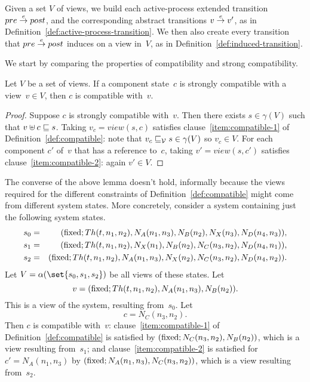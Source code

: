 \begin{definition}
\label{def:abstract-transition}
Given a set $V$ of views, we build each active-process extended transition
$pre \stackrel{e}\rightarrow post$, and the corresponding abstract transitions $v \stackrel{e}\rightarrow
v'$, as in Definition~\ref{def:active-process-transition}.
%
We then also create every transition that $pre \stackrel{e}\rightarrow post$ induces on a
view in~$V$, as in Definition~\ref{def:induced-transition}. 
\end{definition}

We start by comparing the properties of compatibility and strong compatibility.
%
\begin{lemma}
\label{lem:strong-compatible-implies-compatible}
Let $V$ be a set of views.
If a component state~$c$ is strongly compatible with a view~$v \in V$, then
$c$ is compatible with~$v$. 
\end{lemma}
%
\begin{proof}
Suppose $c$ is strongly compatible with~$v$.  Then there exists $s \in
\gamma(V)$ such that $v \uplus c \sqsubseteq s$.  Taking $v_c = view(s, c)$
satisfies clause~\ref{item:compatible-1} of Definition~\ref{def:compatible}:
note that $v_c \sqsubseteq_{\mathcal{V}} s \in \gamma(V)$ so $v_c \in V$.  For each component
$c'$ of~$v$ that has a reference to~$c$, taking $v' = view(s,c')$ satisfies
clause~\ref{item:compatible-2}: again $v' \in V$.
\end{proof}

The converse of the above lemma doesn't hold, informally because the views
required for the different constraints of Definition~\ref{def:compatible}
might come from different system states.  More concretely, consider a system
containing just the following system states.
%
\begin{eqnarray*}
s_0 & = &
   (\mathrm{fixed}; Th(t,n_1,n_2), N_A(n_1,n_3), N_B(n_2), N_X(n_3), N_D(n_4,n_3)), \\
s_1 & = &
  (\mathrm{fixed}; Th(t,n_1,n_2), N_X(n_1), N_B(n_2), N_C(n_3,n_2), N_D(n_4,n_1)),\\
s_2 & = & 
  (\mathrm{fixed}; Th(t,n_1,n_2), N_A(n_1,n_3), N_X(n_2), N_C(n_3,n_2), N_D(n_4,n_2)).
\end{eqnarray*}
%
Let $V = \alpha(\set{s_0,s_1,s_2})$ be all views of these states.  Let
\[
v = (\mathrm{fixed}; Th(t,n_1,n_2), N_A(n_1, n_3), N_B(n_2)).
\]
This is a view of the system, resulting from~$s_0$.  Let 
\[
c = N_C(n_3,n_2).
\]  
Then  $c$ is compatible with~$v$:
%
clause~\ref{item:compatible-1} of Definition~\ref{def:compatible} is satisfied
by $(\mathrm{fixed}; N_C(n_3,n_2), N_B(n_2))$, which is a view resulting
from~$s_1$;
%
and clause~\ref{item:compatible-2} is satisfied for $c' = N_A(n_1,n_3)$ by
$(\mathrm{fixed}; N_A(n_1, n_3), N_C(n_3,n_2))$, which is a view resulting
from~$s_2$. 


